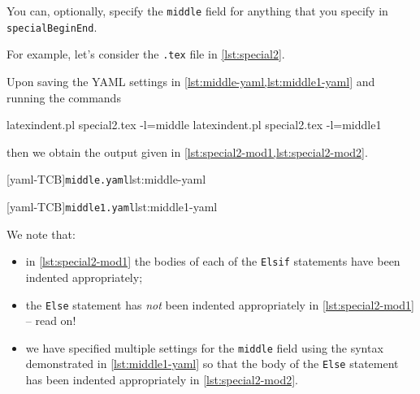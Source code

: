 \documentclass[10pt]{article}
\begin{document}
 You can, optionally, specify  the
 \texttt{middle} field for anything that you specify in \texttt{specialBeginEnd}.

 \begin{example}
 For example, let's consider the \texttt{.tex} file in \cref{lst:special2}.


 Upon saving the YAML settings in \cref{lst:middle-yaml,lst:middle1-yaml} and running the
 commands 

 \begin{commandshell}
latexindent.pl special2.tex -l=middle
latexindent.pl special2.tex -l=middle1
\end{commandshell}

 then we obtain the output given in \cref{lst:special2-mod1,lst:special2-mod2}.

 \begin{cmhtcbraster}
  [yaml-TCB]{\texttt{middle.yaml}}{lst:middle-yaml}
 \end{cmhtcbraster}

 \begin{cmhtcbraster}
  [yaml-TCB]{\texttt{middle1.yaml}}{lst:middle1-yaml}
 \end{cmhtcbraster}

 We note that:
 \begin{itemize}
  \item in \cref{lst:special2-mod1} the bodies of each of the \texttt{Elsif} statements
        have been indented appropriately;
  \item the \texttt{Else} statement has \emph{not} been indented appropriately in
        \cref{lst:special2-mod1} -- read on!
  \item we have specified multiple settings for the \texttt{middle} field using the
        syntax demonstrated in \cref{lst:middle1-yaml} so that the body of the
        \texttt{Else} statement has been indented appropriately in
        \cref{lst:special2-mod2}.
 \end{itemize}
 \end{example}
\end{document}
